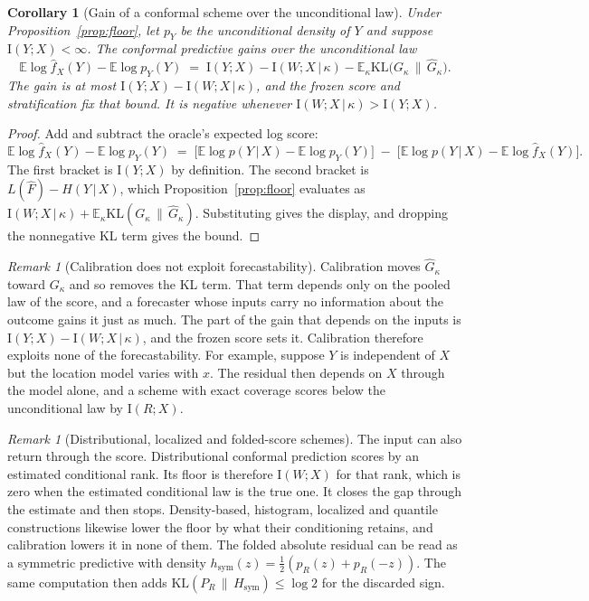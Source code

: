 \documentclass[11pt]{article}
\newtheorem{corollary}[proposition]{Corollary}
\theoremstyle{remark}
\newtheorem{remark}[proposition]{Remark}
\newcommand{\E}{\mathbb{E}}
\newcommand{\I}{\mathrm{I}}
\newcommand{\given}{\,|\,}
\newcommand{\KLop}{\mathrm{KL}}
\begin{document}
\begin{corollary}[Gain of a conformal scheme over the unconditional law]\label{cor:forecastability}
Under Proposition~\ref{prop:floor}, let $p_Y$ be the unconditional density of $Y$ and
suppose $\I(Y;X)<\infty$. The conformal predictive gains over the unconditional law
\[
\E\log\widehat f_X(Y)-\E\log p_Y(Y)
\;=\;\I(Y;X)-\I(W;X\given\kappa)-\E_\kappa\KLop\!\big(G_\kappa\,\|\,\widehat G_\kappa\big).
\]
The gain is at most $\I(Y;X)-\I(W;X\given\kappa)$, and the frozen score and
stratification fix that bound. It is negative whenever $\I(W;X\given\kappa)>\I(Y;X)$.
\end{corollary}

\begin{proof}
Add and subtract the oracle's expected log score:
\[
\E\log\widehat f_X(Y)-\E\log p_Y(Y)
\;=\;\big[\E\log p(Y\given X)-\E\log p_Y(Y)\big]
\;-\;\big[\E\log p(Y\given X)-\E\log\widehat f_X(Y)\big].
\]
The first bracket is $\I(Y;X)$ by definition. The second bracket is
$L(\widehat F)-H(Y\given X)$, which Proposition~\ref{prop:floor} evaluates as
$\I(W;X\given\kappa)+\E_\kappa\KLop(G_\kappa\,\|\,\widehat G_\kappa)$. Substituting
gives the display, and dropping the nonnegative KL term gives the bound.
\end{proof}

\begin{remark}[Calibration does not exploit forecastability]\label{rem:calgain}
Calibration moves $\widehat G_\kappa$ toward $G_\kappa$ and so removes the KL term.
That term depends only on the pooled law of the score, and a forecaster whose inputs
carry no information about the outcome gains it just as much. The part of the gain
that depends on the inputs is $\I(Y;X)-\I(W;X\given\kappa)$, and the frozen score sets
it. Calibration therefore exploits none of the forecastability. For example, suppose $Y$ is independent of $X$ but the location model varies with
$x$. The residual then depends on $X$ through the model alone, and a scheme with exact
coverage scores below the unconditional law by $\I(R;X)$.
\end{remark}

\begin{remark}[Distributional, localized and folded-score schemes]\label{rem:conditional}
The input can also return through the score. Distributional conformal prediction
\citep{chernozhukov2021distributional} scores by an estimated conditional rank. Its
floor is therefore $\I(W;X)$ for that rank, which is zero when the estimated
conditional law is the true one. It closes the gap through the estimate and then stops.
Density-based, histogram, localized and quantile constructions
\citep{izbicki2020,izbicki2022,sesia2021,guan2023localized,romano2019conformalized,cauchois2021}
likewise lower the floor by what their conditioning retains, and calibration lowers it
in none of them. The folded absolute residual can be read as a symmetric predictive
with density $h_{\mathrm{sym}}(z)=\tfrac12(p_R(z)+p_R(-z))$. The same computation then
adds $\KLop(P_R\,\|\,H_{\mathrm{sym}})\le\log 2$ for the discarded sign.
\end{remark}
\end{document}
